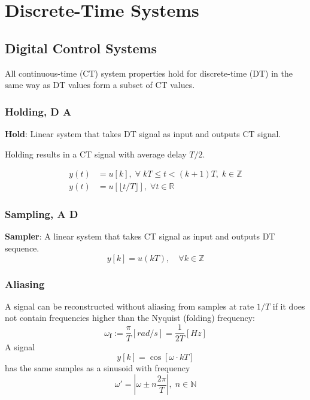 \section{Discrete-Time Systems}
\subsection{Digital Control Systems}
All continuous-time (CT) system properties hold for discrete-time (DT) in the same way as DT values form a subset of CT values.
\subsubsection{Holding, D \textrightarrow{} A}
\textbf{Hold}: Linear system that takes DT signal as input and outputs CT signal.

Holding results in a CT signal with average delay $T/2$.
\newpar{}

\begin{align*}
    y(t) & =u[k], \; \forall \; kT \le t < (k+1)T, \;k \in \mathbb{Z} \\
    y(t) & =u[\lfloor t/T\rfloor], \; \forall t \in \mathbb{R}
\end{align*}

\subsubsection{Sampling, A \textrightarrow{} D}
\textbf{Sampler}: A linear system that takes CT signal as input and outputs DT sequence.
\begin{equation*}
    y[k]=u(kT),\quad\forall k\in\mathbb{Z}
\end{equation*}

\subsubsection{Aliasing}

A signal can be reconstructed without aliasing from samples at rate $1/T$ if it does not contain frequencies higher than the Nyquist (folding) frequency:
\begin{equation*}
    \omega_{\mathbf{f}}:=\frac\pi T[rad/s]=\frac1{2T}[Hz]
\end{equation*}
A signal
\begin{equation*}
    y[k]=\cos[\omega\cdot kT]
\end{equation*}
has the same samples as a sinusoid with frequency
\begin{equation*}
    \omega'=\left|\omega\pm n\frac{2\pi}{T}\right|,\; n\in\mathbb{N}
\end{equation*}

